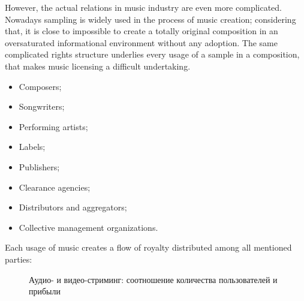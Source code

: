 \documentclass[12pt]{report}
\begin{document}
\begin{multicols}{2}
However, the actual relations in music industry are even more complicated. Nowadays sampling is widely used in the process of music creation; considering that, it is close to impossible to create a totally original composition in an oversaturated informational environment without any adoption. The same complicated rights structure underlies every usage of a sample in a composition, that makes music licensing a difficult undertaking.

\begin{itemize}
	\item Composers;
	\item Songwriters;
	\item Performing artists;
	\item Labels;
	\item Publishers;
	\item Clearance agencies;
	\item Distributors and aggregators;
	\item Collective management organizations.
\end{itemize}
	
Each usage of music creates a flow of royalty distributed among all mentioned parties:
\end{multicols}

\begin{figure}[H]
\centering
\caption{Аудио- и видео-стриминг: соотношение количества пользователей и прибыли}
\vspace{20pt}
\userRevenue
{}
\end{figure}	
\end{document}
